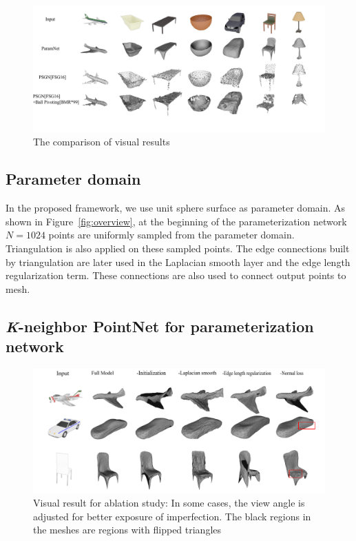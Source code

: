 \begin{figure}[htbp]
	\centering
	\includegraphics[width=\linewidth]{img/res/res}
	\caption{The comparison of visual results}
	\label{fig:res}
\end{figure}

\subsection{Parameter domain}
In the proposed framework, we use unit sphere surface as parameter domain. As shown in Figure~\ref{fig:overview}, at the beginning of the parameterization network $N=1024$ points are uniformly sampled from the parameter domain. Triangulation is also applied on these sampled points. The edge connections built by triangulation are later used in the Laplacian smooth layer and the edge length regularization term. These connections are also used to connect output points to mesh.
\subsection{\textit{K}-neighbor PointNet for parameterization network} 
\label{subsec:k-n_point_net}

\begin{figure}[htbp]
	\centering
	\includegraphics[width=\linewidth]{img/abl/abl}
	\caption{Visual result for ablation study: In some cases, the view angle is adjusted for better exposure of imperfection. The black regions in the meshes are regions with flipped triangles}
	\label{fig:abl}
\end{figure}

